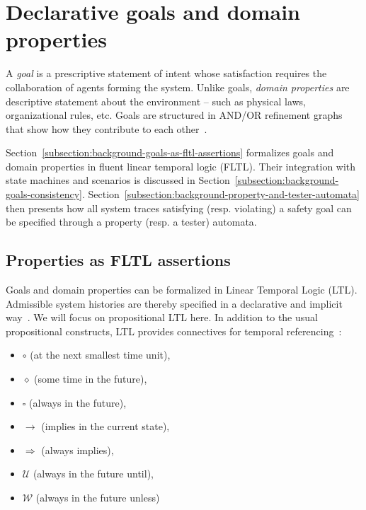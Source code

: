 \section{Declarative goals and domain properties\label{section:background-goals}}

A \emph{goal} is a prescriptive statement of intent whose satisfaction requires the collaboration of agents forming the system. Unlike goals, \emph{domain properties} are descriptive statement about the environment -- such as physical laws, organizational rules, etc. Goals are structured in AND/OR refinement graphs that show how they contribute to each other~\cite{VanLamsweerde:2000}.

Section~\ref{subsection:background-goals-as-fltl-assertions} formalizes goals and domain properties in fluent linear temporal logic (FLTL). Their integration with state machines and scenarios is discussed in Section~\ref{subsection:background-goals-consistency}. Section~\ref{subsection:background-property-and-tester-automata} then presents how all system traces satisfying (resp. violating) a safety goal can be specified through a property (resp. a tester) automata.

\subsection{Properties as FLTL assertions\label{subsection:background-goals-as-fltl-assertions}}

Goals and domain properties can be formalized in Linear Temporal Logic (LTL). Admissible system histories are thereby specified in a declarative and implicit way~\cite{VanLamsweerde:2009}. We will focus on propositional LTL here. In addition to the usual propositional constructs, LTL provides connectives for temporal referencing~\cite{Manna:1992}: 

\begin{itemize}
\item $\circ$ (at the next smallest time unit), 
\item $\diamond$ (some time in the future), 
\item $\square$ (always in the future), 
\item $\rightarrow$ (implies in the current state), 
\item $\Rightarrow$ (always implies), 
\item $\mathcal{U}$ (always in the future until), 
\item $\mathcal{W}$ (always in the future unless)
\end{itemize}

